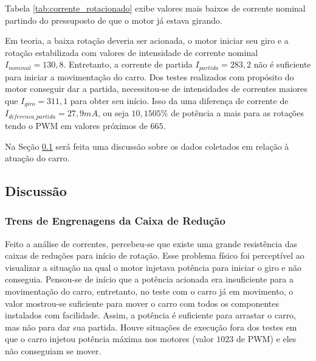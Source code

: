	Tabela \ref{tab:corrente_rotacionado} exibe valores mais baixos de corrente nominal partindo do pressuposto de que o motor já estava girando. 
    
	Em teoria, a baixa rotação deveria ser acionada, o motor iniciar seu giro e a rotação estabilizada com valores de intensidade de corrente nominal $I_{nominal} = 130,8$. Entretanto, a corrente de partida $ I_{partida} = 283,2$ não é suficiente para iniciar a movimentação do carro. Dos testes realizados com propósito do motor conseguir dar a partida, necessitou-se de intensidades de correntes maiores que $I_{giro} = 311,1$ para obter seu início. Isso da uma diferença de corrente de $I_{diferenca\_partida} = 27,9mA$, ou seja $10,1505\%$ de potência a mais para as rotações tendo o PWM em valores próximos de $665$.
    
    Na Seção \ref{sec:discussao} será feita uma discussão sobre os dados coletados em relação à atuação do carro.

	\subsection{Discussão} \label{sec:discussao}


		\subsubsection{Trens de Engrenagens da Caixa de Redução}

			

			Feito a análise de correntes, percebeu-se que existe uma grande resistência das caixas de reduções para início de rotação.
			Esse problema físico foi perceptível ao visualizar a situação na qual o motor injetava potência para iniciar o giro e não conseguia. Pensou-se de início que a potência acionada era insuficiente para a movimentação do carro, entretanto, no teste com o carro já em movimento, o valor mostrou-se suficiente para mover o carro com todos os componentes instalados com facilidade. Assim, a potência é suficiente para arrastar o carro, mas não para dar sua partida.
			Houve situações de execução fora dos testes em que o carro injetou potência máxima nos motores (valor $1023$ de PWM) e eles não conseguiam se mover.

